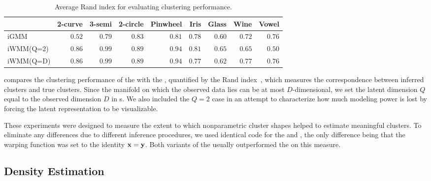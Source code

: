 \begin{table}[ht!]
\centering
\caption[Clustering performance comparison]
{Average Rand index for evaluating clustering performance.}
\label{tab:rand}
\begin{tabular}{lrrrrrrrr}
\hline
 & 2-curve & 3-semi & 2-circle & Pinwheel & Iris  & Glass  & Wine  & Vowel  \\
\hline
iGMM & $0.52$ & $0.79$ & $0.83$ & $0.81$ & $0.78$ & $0.60$ & $0.72$ & $\mathbf{0.76}$ \\
iWMM(Q=2) & $\mathbf{0.86}$ & $\mathbf{0.99}$ & $\mathbf{0.89}$ & $\mathbf{0.94}$ & $\mathbf{0.81}$ & $\mathbf{0.65}$ & $0.65$ & $0.50$ \\
iWMM(Q=D) & $\mathbf{0.86}$ & $\mathbf{0.99}$ & $\mathbf{0.89}$ & $\mathbf{0.94}$ & $0.77$ & $0.62$ & $\mathbf{0.77}$ & $\mathbf{0.76}$ \\
\hline
\end{tabular}
\end{table}
%
 compares the clustering performance of the \iwmm{} with the \iGMM{}, quantified by the Rand index~\citep{rand1971objective}, which measures the correspondence between inferred clusters and true clusters.
Since the manifold on which the observed data lies can be at most $D$-dimensional, we set the latent dimension $Q$ equal to the observed dimension $D$ in \iwmm{}s.
We also included the $Q = 2$ case in an attempt to characterize how much modeling power is lost by forcing the latent representation to be visualizable. 

These experiments were designed to measure the extent to which nonparametric cluster shapes helped to estimate meaningful clusters.
To eliminate any differences due to different inference procedures, we used identical code for the \iGMM{} and \iwmm{}, the only difference being that the warping function was set to the identity ${\bf{x}} = {\bf{y}}$.
Both variants of the \iwmm{} usually outperformed the \iGMM{} on this measure.


\subsection{Density Estimation}

